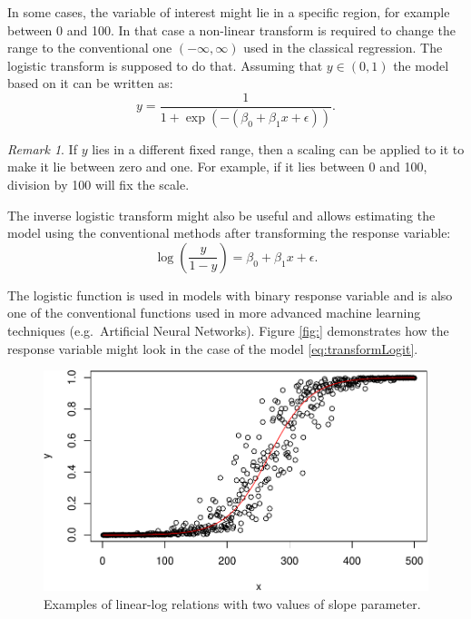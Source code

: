 \documentclass[
]{book}
\theoremstyle{definition}
\theoremstyle{definition}
\theoremstyle{definition}
\theoremstyle{definition}
\theoremstyle{remark}
\newtheorem*{remark}{Remark}
\begin{document}
In some cases, the variable of interest might lie in a specific region, for example between 0 and 100. In that case a non-linear transform is required to change the range to the conventional one \((-\infty, \infty)\) used in the classical regression. The logistic transform is supposed to do that. Assuming that \(y \in (0,1)\) the model based on it can be written as:
\begin{equation}
    y = \frac{1}{1+\exp \left(-(\beta_0 + \beta_1 x + \epsilon)\right)}.
    \label{eq:transformLogit}
\end{equation}

\begin{remark}
If \(y\) lies in a different fixed range, then a scaling can be applied to it to make it lie between zero and one. For example, if it lies between 0 and 100, division by 100 will fix the scale.
\end{remark}

The inverse logistic transform might also be useful and allows estimating the model using the conventional methods after transforming the response variable:
\begin{equation}
    \log \left( \frac{y}{1-y}\right) = \beta_0 + \beta_1 x + \epsilon.
    \label{eq:transformLogitInverse}
\end{equation}

The logistic function is used in models with binary response variable and is also one of the conventional functions used in more advanced machine learning techniques (e.g.~Artificial Neural Networks). Figure \ref{fig:} demonstrates how the response variable might look in the case of the model \eqref{eq:transformLogit}.

\begin{figure}
\centering
\includegraphics{Svetunkov---Statistics-for-Business-Analytics_files/figure-latex/transformationsExamples06-1.pdf}
\caption{\label{fig:transformationsExamples06}Examples of linear-log relations with two values of slope parameter.}
\end{figure}
\end{document}
